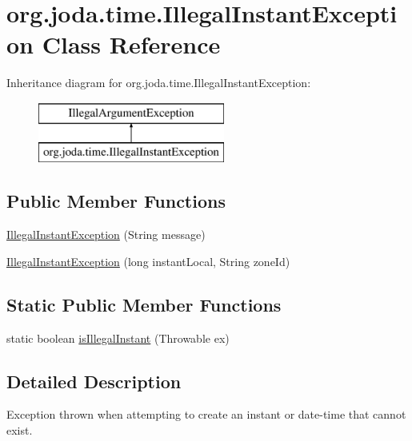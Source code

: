 \hypertarget{classorg_1_1joda_1_1time_1_1_illegal_instant_exception}{\section{org.\-joda.\-time.\-Illegal\-Instant\-Exception Class Reference}
\label{classorg_1_1joda_1_1time_1_1_illegal_instant_exception}
}
Inheritance diagram for org.\-joda.\-time.\-Illegal\-Instant\-Exception\-:\begin{figure}[H]
\begin{center}
\leavevmode
\includegraphics[height=2.000000cm]{classorg_1_1joda_1_1time_1_1_illegal_instant_exception}
\end{center}
\end{figure}
\subsection*{Public Member Functions}
\begin{DoxyCompactItemize}
\item 
\hyperlink{classorg_1_1joda_1_1time_1_1_illegal_instant_exception_a5587ab31d9a4e615779b28fd4234978c}{Illegal\-Instant\-Exception} (String message)
\item 
\hyperlink{classorg_1_1joda_1_1time_1_1_illegal_instant_exception_a8e359b961f16a2bc4bfe903e9a05fad4}{Illegal\-Instant\-Exception} (long instant\-Local, String zone\-Id)
\end{DoxyCompactItemize}
\subsection*{Static Public Member Functions}
\begin{DoxyCompactItemize}
\item 
static boolean \hyperlink{classorg_1_1joda_1_1time_1_1_illegal_instant_exception_ad095244e8c2370e5bcbec0b940c09707}{is\-Illegal\-Instant} (Throwable ex)
\end{DoxyCompactItemize}


\subsection{Detailed Description}
Exception thrown when attempting to create an instant or date-\/time that cannot exist. 

